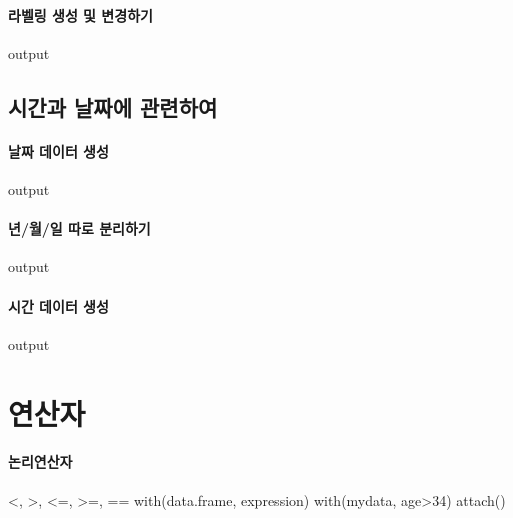 \documentclass{book}
\begin{document}
\paragraph{라벨링 생성 및 변경하기}
\begin{Schunk}
\begin{Soutput}
output
\end{Soutput}
\end{Schunk}


\subsection{시간과 날짜에 관련하여}

\paragraph{날짜 데이터 생성}
\begin{Schunk}
\begin{Soutput}
output
\end{Soutput}
\end{Schunk}

\paragraph{년/월/일 따로 분리하기}
\begin{Schunk}
\begin{Soutput}
output
\end{Soutput}
\end{Schunk}

\paragraph{시간 데이터 생성}
\begin{Schunk}
\begin{Soutput}
output
\end{Soutput}
\end{Schunk}


\section{연산자}
\paragraph{논리연산자}
\begin{Schunk}
\begin{Soutput}
<, >, <=, >=, ==
with(data.frame, expression)
with(mydata, age>34)
attach()

\end{Soutput}
\end{Schunk}
\end{document}
